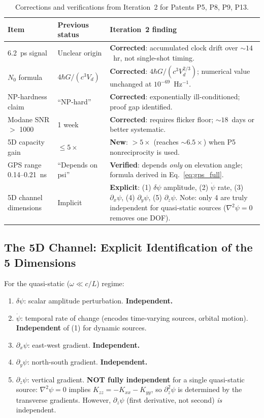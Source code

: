 \documentclass[aps,prd,twocolumn,superscriptaddress,nofootinbib]{revtex4-2}
\begin{document}
\begin{table}[h]
\caption{Corrections and verifications from Iteration~2 for Patents P5, P8, P9, P13.}
\begin{ruledtabular}
\begin{tabular}{p{3cm}p{3cm}p{3cm}}
Item & Previous status & Iteration~2 finding \\
\hline
6.2~ps signal & Unclear origin & \textbf{Corrected}: accumulated clock drift
over $\sim 14$~hr, not single-shot timing. \\
$N_0$ formula & $4\hbar G/(c^3 V_d)$ & \textbf{Corrected}: $4\hbar G/(c^3 V_d^{2/3})$;
numerical value unchanged at $10^{-69}$~Hz$^{-1}$. \\
NP-hardness claim & ``NP-hard'' & \textbf{Corrected}: exponentially ill-conditioned;
proof gap identified. \\
Modane SNR $>$ 1000 & 1 week & \textbf{Corrected}: requires flicker floor;
$\sim 18$~days or better systematic. \\
5D capacity gain & $\leq 5\times$ & \textbf{New}: $> 5\times$ (reaches
$\sim 6.5\times$) when P5 nonreciprocity is used. \\
GPS range 0.14--0.21~ns & ``Depends on psi'' & \textbf{Verified}: depends
\emph{only} on elevation angle; formula derived in Eq.~\eqref{eq:gps_full}. \\
5D channel dimensions & Implicit & \textbf{Explicit}: (1) $\delta\psi$ amplitude,
(2) $\dot\psi$ rate, (3) $\partial_x\psi$, (4) $\partial_y\psi$,
(5) $\partial_z\psi$. Note: only 4 are truly independent for quasi-static
sources ($\nabla^2\psi = 0$ removes one DOF). \\
\end{tabular}
\end{ruledtabular}
\end{table}

\subsection{The 5D Channel: Explicit Identification of the 5 Dimensions}

For the quasi-static ($\omega \ll c/L$) regime:
\begin{enumerate}
\item $\delta\psi$: scalar amplitude perturbation. \textbf{Independent.}
\item $\dot\psi$: temporal rate of change (encodes time-varying sources,
orbital motion).  \textbf{Independent} of (1) for dynamic sources.
\item $\partial_x\psi$: east-west gradient.  \textbf{Independent.}
\item $\partial_y\psi$: north-south gradient.  \textbf{Independent.}
\item $\partial_z\psi$: vertical gradient.  \textbf{NOT fully independent}
for a single quasi-static source: $\nabla^2\psi = 0$ implies
$K_{zz} = -K_{xx}-K_{yy}$, so $\partial_z^2\psi$ is determined by the
transverse gradients.  However, $\partial_z\psi$ (first derivative, not
second) \emph{is} independent.
\end{enumerate}
\end{document}
